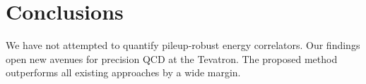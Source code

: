\section{Conclusions}\label{sec:conclusions}

We have not attempted to quantify pileup-robust energy correlators. Our
findings open new avenues for precision QCD at the Tevatron. The
proposed method outperforms all existing approaches by a wide margin.

